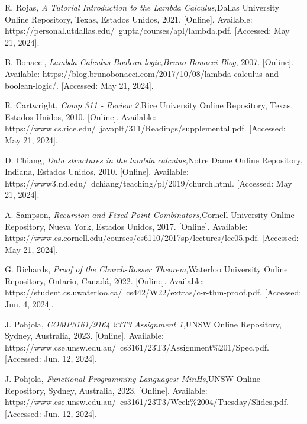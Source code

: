 \begin{thebibliography}{11}
    \label{sec:109}
    \hypertarget{109}{}
    R. Rojas, \textit{A Tutorial Introduction to the Lambda Calculus,}Dallas University Online Repository, Texas, Estados Unidos, 2021. [Online]. Available: https://personal.utdallas.edu/~gupta/courses/apl/lambda.pdf. [Accessed: May 21, 2024].

    \label{sec:110}
    \hypertarget{110}{}
    B. Bonacci, \textit{Lambda Calculus Boolean logic,}\textit{Bruno Bonacci Blog}, 2007. [Online]. Available: https://blog.brunobonacci.com/2017/10/08/lambda-calculus-and-boolean-logic/. [Accessed: May 21, 2024].

    \label{sec:111}
    \hypertarget{111}{}
    R. Cartwright, \textit{Comp 311 - Review 2,}Rice University Online Repository, Texas, Estados Unidos, 2010. [Online]. Available: https://www.cs.rice.edu/~javaplt/311/Readings/supplemental.pdf. [Accessed: May 21, 2024].

    \label{sec:112}
    \hypertarget{112}{}
    D. Chiang, \textit{Data structures in the lambda calculus,}Notre Dame Online Repository, Indiana, Estados Unidos, 2010. [Online]. Available: https://www3.nd.edu/~dchiang/teaching/pl/2019/church.html. [Accessed: May 21, 2024].

    \label{sec:113}
    \hypertarget{113}{}
    A. Sampson, \textit{Recursion and Fixed-Point Combinators,}Cornell University Online Repository, Nueva York, Estados Unidos, 2017. [Online]. Available: https://www.cs.cornell.edu/courses/cs6110/2017sp/lectures/lec05.pdf. [Accessed: May 21, 2024].

    \label{sec:114}
    \hypertarget{114}{}
    G. Richards, \textit{Proof of the Church-Rosser Theorem,}Waterloo University Online Repository, Ontario, Canadá, 2022. [Online]. Available: https://student.cs.uwaterloo.ca/~cs442/W22/extras/c-r-thm-proof.pdf. [Accessed: Jun. 4, 2024].

    \label{sec:115}
    \hypertarget{115}{}
    J. Pohjola, \textit{COMP3161/9164 23T3 Assignment 1,}UNSW Online Repository, Sydney, Australia, 2023. [Online]. Available: https://www.cse.unsw.edu.au/~cs3161/23T3/Assignment\%201/Spec.pdf. [Accessed: Jun. 12, 2024].

    \label{sec:116}
    \hypertarget{116}{}
    J. Pohjola, \textit{Functional Programming Languages: MinHs,}UNSW Online Repository, Sydney, Australia, 2023. [Online]. Available: https://www.cse.unsw.edu.au/~cs3161/23T3/Week\%2004/Tuesday/Slides.pdf. [Accessed: Jun. 12, 2024].


\end{thebibliography}

